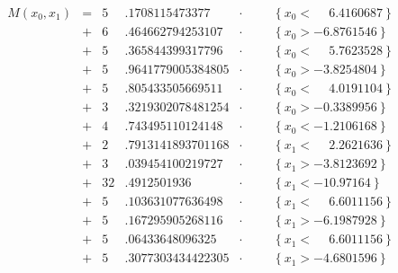 \documentclass[parskip=half,a4paper]{scrartcl}
\begin{document}
\begin{align*}
    M(x_0,x_1) &= & 5&.1708115473377 &\cdot&&& \left\{x_0 < \phantom{-}6.4160687\right\} \\
 & + &  6&.464662794253107 &\cdot&&& \left\{x_0 > -6.8761546\right\} \\
 & + &  5&.365844399317796 &\cdot&&& \left\{x_0 < \phantom{-}5.7623528\right\} \\
 & + &  5&.9641779005384805 &\cdot&&& \left\{x_0 > -3.8254804\right\} \\
 & + &  5&.805433505669511 &\cdot&&& \left\{x_0 < \phantom{-}4.0191104\right\} \\
 & + &  3&.3219302078481254 &\cdot&&& \left\{x_0 > -0.3389956\right\} \\
 & + &  4&.743495110124148 &\cdot&&& \left\{x_0 < -1.2106168\right\} \\
 & + &  2&.7913141893701168 &\cdot&&& \left\{x_1 < \phantom{-}2.2621636\right\} \\
 & + &  3&.039454100219727 &\cdot&&& \left\{x_1 > -3.8123692\right\} \\
 & + &  32&.4912501936 &\cdot&&& \left\{x_1 < -10.97164\right\} \\
 & + &  5&.103631077636498 &\cdot&&& \left\{x_1 < \phantom{-}6.6011156\right\} \\
 & + &  5&.167295905268116 &\cdot&&& \left\{x_1 > -6.1987928\right\} \\
 & + &  5&.06433648096325 &\cdot&&& \left\{x_1 < \phantom{-}6.6011156\right\} \\
 & + &  5&.3077303434422305 &\cdot&&& \left\{x_1 > -4.6801596\right\}
\end{align*}
\end{document}

